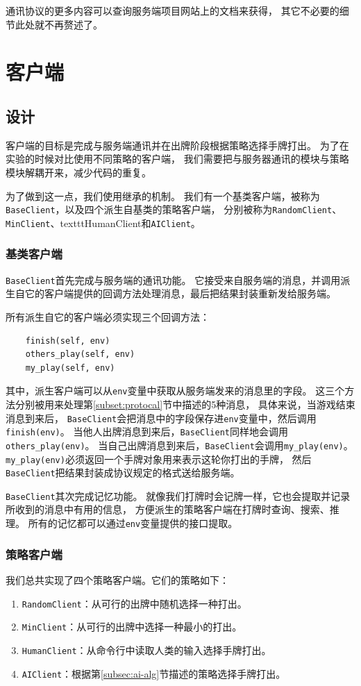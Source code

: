 \documentclass[a4paper]{ctexart}
\begin{document}
通讯协议的更多内容可以查询服务端项目网站\cite{jsai}上的文档来获得，
其它不必要的细节此处就不再赘述了。

\section{客户端} \label{sec:client}
\subsection{设计}
客户端的目标是完成与服务端通讯并在出牌阶段根据策略选择手牌打出。
为了在实验的时候对比使用不同策略的客户端，
我们需要把与服务器通讯的模块与策略模块解耦开来，减少代码的重复。

为了做到这一点，我们使用继承的机制。
我们有一个基类客户端，被称为\texttt{BaseClient}，以及四个派生自基类的策略客户端，
分别被称为\texttt{RandomClient}、\texttt{MinClient}、texttt{HumanClient}和\texttt{AIClient}。

\subsubsection{基类客户端}
\texttt{BaseClient}首先完成与服务端的通讯功能。
它接受来自服务端的消息，并调用派生自它的客户端提供的回调方法处理消息，最后把结果封装重新发给服务端。

所有派生自它的客户端必须实现三个回调方法：
\begin{verbatim}
    finish(self, env)
    others_play(self, env)
    my_play(self, env)
\end{verbatim}
其中，派生客户端可以从\texttt{env}变量中获取从服务端发来的消息里的字段。
这三个方法分别被用来处理第\ref{subset:protocal}节中描述的5种消息，
具体来说，当游戏结束消息到来后，
\texttt{BaseClient}会把消息中的字段保存进\texttt{env}变量中，然后调用\texttt{finish(env)}。
当他人出牌消息到来后，\texttt{BaseClient}同样地会调用\texttt{others\_play(env)}。
当自己出牌消息到来后，\texttt{BaseClient}会调用\texttt{my\_play(env)}。
\texttt{my\_play(env)}必须返回一个手牌对象用来表示这轮你打出的手牌，
然后\texttt{BaseClient}把结果封装成协议规定的格式送给服务端。

\texttt{BaseClient}其次完成记忆功能。
就像我们打牌时会记牌一样，它也会提取并记录所收到的消息中有用的信息，
方便派生的策略客户端在打牌时查询、搜索、推理。
所有的记忆都可以通过\texttt{env}变量提供的接口提取。

\subsubsection{策略客户端}
我们总共实现了四个策略客户端。它们的策略如下：
\begin{enumerate}
  \item
  \texttt{RandomClient}：从可行的出牌中随机选择一种打出。

  \item
  \texttt{MinClient}：从可行的出牌中选择一种最小的打出。

  \item
  \texttt{HumanClient}：从命令行中读取人类的输入选择手牌打出。

  \item 
  \texttt{AIClient}：根据第\ref{subsec:ai-alg}节描述的策略选择手牌打出。
\end{enumerate}
\end{document}
